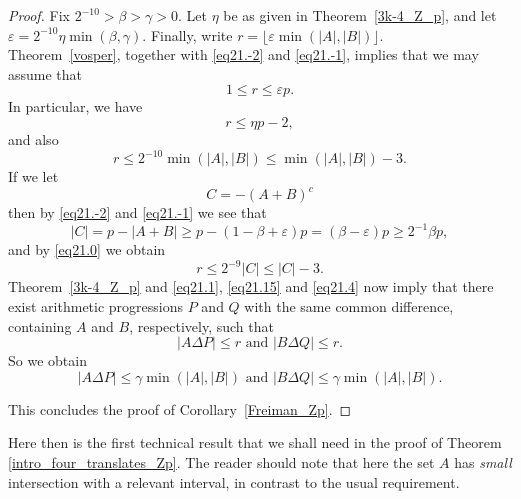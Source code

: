 \documentclass[12pt,reqno]{amsart}
\theoremstyle{definition}
\renewcommand\leq{\leqslant}
\renewcommand\geq{\geqslant}
\begin{document}
\begin{proof}
  Fix $2^{-10}> \beta >\gamma>0$. Let $\eta$ be as given in Theorem~\ref{3k-4_Z_p}, and let
  $\varepsilon=2^{-10} \eta \min(\beta, \gamma)$. Finally, write $r=\lfloor\varepsilon\min(|A|,|B|)\rfloor$.\\

\vspace{5pt}
Theorem~\ref{vosper}, together with \eqref{eq21.-2} and \eqref{eq21.-1}, implies that we may assume that
\begin{equation}\label{eq21.0}
    1 \leq  r \leq \varepsilon p.
\end{equation}
In particular, we have
\begin{equation}\label{eq21.1}
    r \leq \eta p-2,
\end{equation}
and also
\begin{equation}\label{eq21.15}
    r \leq 2^{-10}\min(|A|,|B|) \leq \min(|A|,|B|)-3.
\end{equation}
If we let
\begin{equation*}\label{eq21.2}
    C=-(A+B)^{c}
\end{equation*}
then by \eqref{eq21.-2} and \eqref{eq21.-1} we see that
\begin{equation*}\label{eq21.3}
    |C|=p-|A+B|\geq p-(1-\beta+\varepsilon)p=(\beta-\varepsilon)p \geq 2^{-1}\beta p,
\end{equation*}
and by \eqref{eq21.0} we obtain
\begin{equation}\label{eq21.4}
    r\leq 2^{-9}|C| \leq |C|-3.
\end{equation}
Theorem~\ref{3k-4_Z_p} and  \eqref{eq21.1}, \eqref{eq21.15} and \eqref{eq21.4} now imply that there exist arithmetic
progressions $P$ and $Q$ with the same common difference, containing $A$ and $B$, respectively, such that
\begin{equation*}\label{eq21.5}
    |A\Delta P|\leq r \text{ and } |B \Delta Q|\leq r.
\end{equation*}
So we obtain
$$|A\Delta P|\leq \gamma \min(|A|,|B|) \text{ and } |B\Delta Q| \leq \gamma \min(|A|,|B|).$$

\vspace{5pt}
This concludes the proof of Corollary~\ref{Freiman_Zp}.
\end{proof}

\vspace{5pt}

Here then is the first technical result that we shall need in the proof of Theorem \ref{intro_four_translates_Zp}.
The reader should note that here the set $A$ has {\it small} intersection with a relevant
interval, in contrast to the usual requirement.
\end{document}
